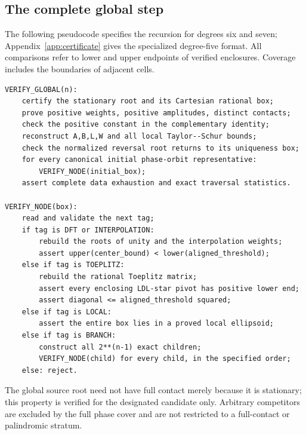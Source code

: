 \documentclass[11pt]{article}
\begin{document}
\subsection{The complete global step}
The following pseudocode specifies the recursion for degrees six and
seven; Appendix~\ref{app:certificate} gives the specialized degree-five
format. All comparisons refer to lower and upper endpoints of verified
enclosures. Coverage includes the boundaries of adjacent cells.
\begin{Verbatim}
VERIFY_GLOBAL(n):
    certify the stationary root and its Cartesian rational box;
    prove positive weights, positive amplitudes, distinct contacts;
    check the positive constant in the complementary identity;
    reconstruct A,B,L,W and all local Taylor--Schur bounds;
    check the normalized reversal root returns to its uniqueness box;
    for every canonical initial phase-orbit representative:
        VERIFY_NODE(initial_box);
    assert complete data exhaustion and exact traversal statistics.

VERIFY_NODE(box):
    read and validate the next tag;
    if tag is DFT or INTERPOLATION:
        rebuild the roots of unity and the interpolation weights;
        assert upper(center_bound) < lower(aligned_threshold);
    else if tag is TOEPLITZ:
        rebuild the rational Toeplitz matrix;
        assert every enclosing LDL-star pivot has positive lower end;
        assert diagonal <= aligned_threshold squared;
    else if tag is LOCAL:
        assert the entire box lies in a proved local ellipsoid;
    else if tag is BRANCH:
        construct all 2**(n-1) exact children;
        VERIFY_NODE(child) for every child, in the specified order;
    else: reject.
\end{Verbatim}
The global source root need not have full contact merely because it is
stationary; this property is verified for the designated candidate only.
Arbitrary competitors are excluded by the full phase cover and are not
restricted to a full-contact or palindromic stratum.
\end{document}
